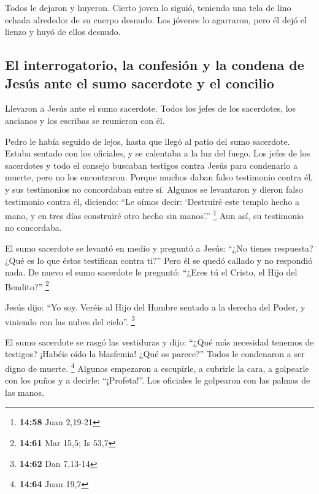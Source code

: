  Todos le dejaron y huyeron.  Cierto joven
lo siguió, teniendo una tela de lino echada alrededor de su cuerpo
desnudo. Los jóvenes lo agarraron,  pero él dejó el
lienzo y huyó de ellos desnudo.

\hypertarget{el-interrogatorio-la-confesiuxf3n-y-la-condena-de-jesuxfas-ante-el-sumo-sacerdote-y-el-concilio}{%
\subsection{El interrogatorio, la confesión y la condena de Jesús ante
el sumo sacerdote y el
concilio}\label{el-interrogatorio-la-confesiuxf3n-y-la-condena-de-jesuxfas-ante-el-sumo-sacerdote-y-el-concilio}}

 Llevaron a Jesús ante el sumo sacerdote. Todos los jefes
de los sacerdotes, los ancianos y los escribas se reunieron con él.

 Pedro le había seguido de lejos, hasta que llegó al
patio del sumo sacerdote. Estaba sentado con los oficiales, y se
calentaba a la luz del fuego.  Los jefes de los
sacerdotes y todo el consejo buscaban testigos contra Jesús para
condenarlo a muerte, pero no los encontraron.  Porque
muchos daban falso testimonio contra él, y sus testimonios no
concordaban entre sí.  Algunos se levantaron y dieron
falso testimonio contra él, diciendo:  ``Le oímos decir:
`Destruiré este templo hecho a mano, y en tres días construiré otro
hecho sin manos'.'' \footnote{\textbf{14:58} Juan 2,19-21}
 Aun así, su testimonio no concordaba.

 El sumo sacerdote se levantó en medio y preguntó a
Jesús: ``¿No tienes respuesta? ¿Qué es lo que éstos testifican contra
ti?''  Pero él se quedó callado y no respondió nada. De
nuevo el sumo sacerdote le preguntó: ``¿Eres tú el Cristo, el Hijo del
Bendito?'' \footnote{\textbf{14:61} Mar 15,5; Is 53,7}

 Jesús dijo: ``Yo soy. Veréis al Hijo del Hombre sentado
a la derecha del Poder, y viniendo con las nubes del cielo''.
\footnote{\textbf{14:62} Dan 7,13-14}

 El sumo sacerdote se rasgó las vestiduras y dijo: ``¿Qué
más necesidad tenemos de testigos?  ¡Habéis oído la
blasfemia! ¿Qué os parece?'' Todos le condenaron a ser digno de muerte.
\footnote{\textbf{14:64} Juan 19,7}  Algunos empezaron a
escupirle, a cubrirle la cara, a golpearle con los puños y a decirle:
``¡Profeta!''. Los oficiales le golpearon con las palmas de las manos.


